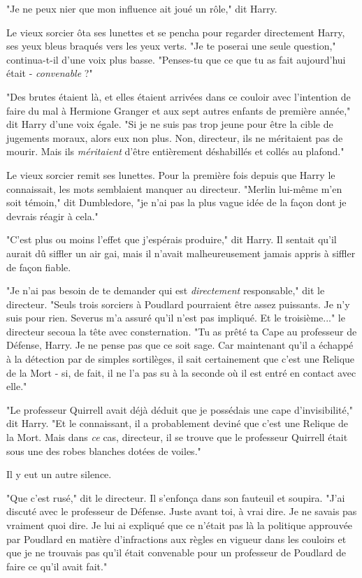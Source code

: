 "Je ne peux nier que mon influence ait joué un rôle," dit Harry.

Le vieux sorcier ôta ses lunettes et se pencha pour regarder directement Harry, ses yeux bleus braqués vers les yeux verts. "Je te poserai une seule question," continua-t-il d'une voix plus basse. "Penses-tu que ce que tu as fait aujourd'hui était - \emph{convenable}  ?"

"Des brutes étaient là, et elles étaient arrivées dans ce couloir avec l'intention de faire du mal à Hermione Granger et aux sept autres enfants de première année," dit Harry d'une voix égale. "Si je ne suis pas trop jeune pour être la cible de jugements moraux, alors eux non plus. Non, directeur, ils ne méritaient pas de mourir. Mais ils \emph{méritaient}  d'être entièrement déshabillés et collés au plafond."

Le vieux sorcier remit ses lunettes. Pour la première fois depuis que Harry le connaissait, les mots semblaient manquer au directeur. "Merlin lui-même m'en soit témoin," dit Dumbledore, "je n'ai pas la plus vague idée de la façon dont je devrais réagir à cela."

"C'est plus ou moins l'effet que j'espérais produire," dit Harry. Il sentait qu'il aurait dû siffler un air gai, mais il n'avait malheureusement jamais appris à siffler de façon fiable.

"Je n'ai pas besoin de te demander qui est \emph{directement}  responsable," dit le directeur. "Seuls trois sorciers à Poudlard pourraient être assez puissants. Je n'y suis pour rien. Severus m'a assuré qu'il n'est pas impliqué. Et le troisième..." le directeur secoua la tête avec consternation. "Tu as prêté ta Cape au professeur de Défense, Harry. Je ne pense pas que ce soit sage. Car maintenant qu'il a échappé à la détection par de simples sortilèges, il sait certainement que c'est une Relique de la Mort - si, de fait, il ne l'a pas su à la seconde où il est entré en contact avec elle."

"Le professeur Quirrell avait déjà déduit que je possédais une cape d'invisibilité," dit Harry. "Et le connaissant, il a probablement deviné que c'est une Relique de la Mort. Mais dans \emph{ce}  cas, directeur, il se trouve que le professeur Quirrell était sous une des robes blanches dotées de voiles."

Il y eut un autre silence.

"Que c'est rusé," dit le directeur. Il s'enfonça dans son fauteuil et soupira. "J'ai discuté avec le professeur de Défense. Juste avant toi, à vrai dire. Je ne savais pas vraiment quoi dire. Je lui ai expliqué que ce n'était pas là la politique approuvée par Poudlard en matière d'infractions aux règles en vigueur dans les couloirs et que je ne trouvais pas qu'il était convenable pour un professeur de Poudlard de faire ce qu'il avait fait."

